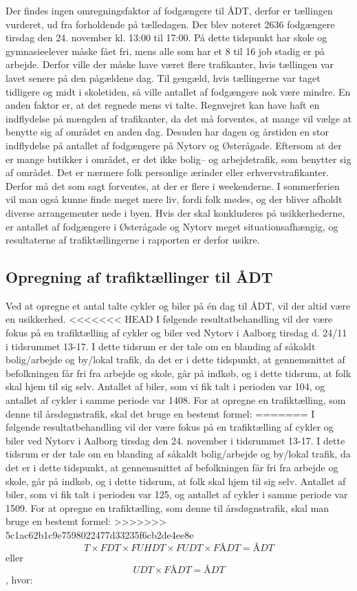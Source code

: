 Der findes ingen omregningsfaktor af fodgængere til ÅDT, derfor er tællingen vurderet, ud fra forholdende på tælledagen. Der blev noteret 2636 fodgængere tirsdag den 24. november kl. 13:00 til 17:00. På dette tidspunkt har skole og gymnasieelever måske fået fri, mens alle som har et 8 til 16 job stadig er på arbejde. Derfor ville der måske have været flere trafikanter, hvis tællingen var lavet senere på den pågældene dag. Til gengæld, hvis tællingerne var taget tidligere og midt i skoletiden, så ville antallet af fodgængere nok være mindre. En anden faktor er, at det regnede mens vi talte. Regnvejret kan have haft en indflydelse på mængden af trafikanter, da det må forventes, at mange vil vælge at benytte sig af området en anden dag. Desuden har dagen og årstiden en stor indflydelse på antallet af fodgængere på Nytorv og Østerågade. Eftersom at der er mange butikker i området, er det ikke bolig– og arbejdetrafik, som benytter sig af området. Det er nærmere folk personlige ærinder eller erhvervstrafikanter. Derfor må det som sagt forventes, at der er flere i weekenderne. I sommerferien vil man også kunne finde meget mere liv, fordi folk mødes, og der bliver afholdt diverse arrangementer nede i byen. Hvis der skal konkluderes på usikkerhederne, er antallet af fodgængere i Østerågade og Nytorv meget situationsafhængig, og resultaterne af trafiktællingerne i rapporten er derfor usikre.
\subsection{Opregning af trafiktællinger til ÅDT}
\label{sub:opregning}
Ved at opregne et antal talte cykler og biler på én dag til ÅDT, vil der altid være en usikkerhed.
<<<<<<< HEAD
I følgende resultatbehandling vil der være fokus på en trafiktælling af cykler og biler ved Nytorv i Aalborg tirsdag d. 24/11 i tidsrummet 13-17. I dette tidsrum er der tale om en blanding af såkaldt bolig/arbejde og by/lokal trafik, da det er i dette tidspunkt, at gennemsnittet af befolkningen får fri fra arbejde og skole, går på indkøb, og i dette tidsrum, at folk skal hjem til sig selv.
Antallet af biler, som vi fik talt i perioden var 104, og antallet af cykler i samme periode var 1408.
For at opregne en trafiktælling, som denne til årsdøgnstrafik, skal det bruge en bestemt formel:
=======
I følgende resultatbehandling vil der være fokus på en trafiktælling af cykler og biler ved Nytorv i Aalborg tirsdag den 24. november i tidsrummet 13-17. I dette tidsrum er der tale om en blanding af såkaldt bolig/arbejde og by/lokal trafik, da det er i dette tidspunkt, at gennemsnittet af befolkningen får fri fra arbejde og skole, går på indkøb, og i dette tidsrum, at folk skal hjem til sig selv.
Antallet af biler, som vi fik talt i perioden var 125, og antallet af cykler i samme periode var 1509.
For at opregne en trafiktælling, som denne til årsdøgnstrafik, skal man bruge en bestemt formel:
>>>>>>> 5c1ac62b1c9e7598022477d33235f6cb2de4ee8e
$$ T \times FDT \times FUHDT \times FUDT \times FÅDT = ÅDT $$ eller $$ UDT \times FÅDT = ÅDT$$ , hvor:

